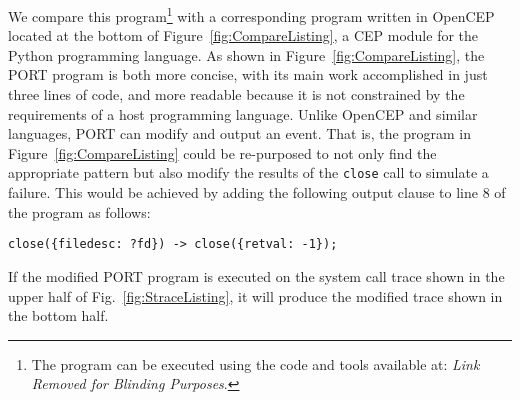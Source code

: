 We compare this program\footnote{The program can be executed using the code and tools available at: \textit{Link Removed for Blinding Purposes}.}
with a corresponding program written in OpenCEP~\cite{open_cep_website} located at the bottom of Figure~\ref{fig:CompareListing},
a CEP module for the Python programming language.
As shown in Figure~\ref{fig:CompareListing},
the PORT program is both more concise, with its main work accomplished in just
three lines of code, and more readable because it is not constrained by the
requirements of a host programming language.
Unlike  OpenCEP and similar languages, PORT can modify and output an event.
That is, the program in Figure~\ref{fig:CompareListing} could be
re-purposed to not only find the appropriate pattern but also modify the
results of the {\tt close} call to simulate a failure.
This would be achieved
by adding the following output clause to line 8 of the program 
as follows:
\begin{lstlisting}[numbers=none,xleftmargin=0em,gobble=2]
  close({filedesc: ?fd}) -> close({retval: -1});
\end{lstlisting}
If the modified PORT program is executed on the system call trace shown in the upper half of Fig.~\ref{fig:StraceListing}, it will produce the modified trace shown in the bottom half.







